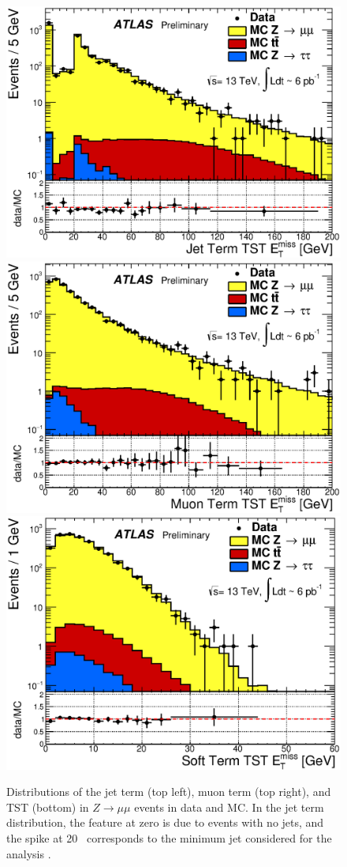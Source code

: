 \begin{centering}
\begin{figure}[!hbt]
\myfloatalign
\includegraphics[width=.48\linewidth]{figures/reco/met_fig_02a.eps}
\includegraphics[width=.48\linewidth]{figures/reco/met_fig_02b.eps} \\
\includegraphics[width=.48\linewidth]{figures/reco/met_fig_02c.eps}
\caption{ Distributions of the jet term (top left), muon term (top right), and \ac{TST} (bottom) \met in $Z\rightarrow\mu\mu$ events in data and \ac{MC}. In the jet term distribution, the feature at zero is due to events with no jets, and the spike at 20 \gev~corresponds to the minimum jet \pt considered for the analysis \cite{ATL-PHYS-PUB-2015-027}. }
\label{fig:reco_met_terms}
\end{figure}
\end{centering}




